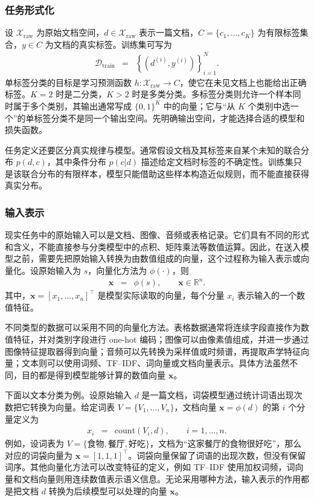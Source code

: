 \subsubsection{任务形式化}

设 $\mathcal{X}_{\mathrm{raw}}$ 为原始文档空间，$d\in\mathcal{X}_{\mathrm{raw}}$ 表示一篇文档，$C=\{c_1,\ldots,c_K\}$ 为有限标签集合，$y\in C$ 为文档的真实标签。训练集可写为
\begin{eqnarray}
\mathcal{D}_{\mathrm{train}}
& = &
\left\{\left(d^{(i)},y^{(i)}\right)\right\}_{i=1}^{N}.
\end{eqnarray}
单标签分类的目标是学习预测函数 $h:\mathcal{X}_{\mathrm{raw}}\rightarrow C$，使它在未见文档上也能给出正确标签。$K=2$ 时是二分类，$K>2$ 时是多类分类。多标签分类则允许一个样本同时属于多个类别，其输出通常写成 $\{0,1\}^{K}$ 中的向量；它与“从 $K$ 个类别中选一个”的单标签分类不是同一个输出空间。先明确输出空间，才能选择合适的模型和损失函数。

任务定义还要区分真实规律与模型。通常假设文档及其标签来自某个未知的联合分布 $p(d,c)$，其中条件分布 $p(c|d)$ 描述给定文档时标签的不确定性。训练集只是该联合分布的有限样本，模型只能借助这些样本构造近似规则，而不能直接获得真实分布。

\subsubsection{输入表示}

现实任务中的原始输入可以是文档、图像、音频或表格记录。它们具有不同的形式和含义，不能直接参与分类模型中的点积、矩阵乘法等数值运算。因此，在送入模型之前，需要先把原始输入转换为由数值组成的向量，这个过程称为输入表示或向量化。设原始输入为 $s$，向量化方法为 $\phi(\cdot)$，则
\begin{eqnarray}
\mathbf{x} & = & \phi(s),
\qquad \mathbf{x}\in\mathbb{R}^{n}.
\end{eqnarray}
其中，$\mathbf{x}=[x_1,\ldots,x_n]^{\top}$ 是模型实际读取的向量，每个分量 $x_i$ 表示输入的一个数值特征。

不同类型的数据可以采用不同的向量化方法。表格数据通常将连续字段直接作为数值特征，并对类别字段进行 one-hot 编码；图像可以由像素值组成，并进一步通过图像特征提取器得到向量；音频可以先转换为采样值或时频谱，再提取声学特征向量；文本则可以使用词频、TF--IDF、词向量或文档向量表示。具体方法虽然不同，目的都是得到模型能够计算的数值向量 $\mathbf{x}$。

下面以文本分类为例。设原始输入 $d$ 是一篇文档，词袋模型通过统计词语出现次数把它转换为向量。给定词表 $V=\{V_1,\ldots,V_n\}$，文档向量 $\mathbf{x}=\phi(d)$ 的第 $i$ 个分量定义为
\begin{eqnarray}
x_i & = & \mathrm{count}(V_i,d),
\qquad i=1,\ldots,n.
\end{eqnarray}
例如，设词表为 $V=\{\text{食物},\text{餐厅},\text{好吃}\}$，文档为“这家餐厅的食物很好吃”，那么对应的词袋向量为 $\mathbf{x}=[1,1,1]^{\top}$。词袋向量保留了词语的出现次数，但没有保留词序。其他向量化方法可以改变特征的定义，例如 TF--IDF 使用加权词频，词向量和文档向量则用连续数值表示语义信息。无论采用哪种方法，输入表示的作用都是把文档 $d$ 转换为后续模型可以处理的向量 $\mathbf{x}$。


